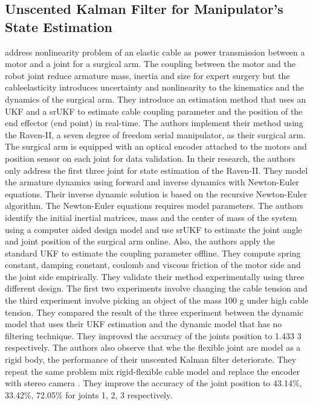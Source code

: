 \subsection{Unscented Kalman Filter for Manipulator's State Estimation}\label{sec:ukf_state_estimation}
\textcite{Haghighipanah2015} address nonlinearity problem of an elastic cable as power
transmission between a motor and a joint for a surgical arm. The coupling between the motor
and the robot joint reduce armature mass, inertia and size for expert surgery but the cableelasticity introduces uncertainty and nonlinearity to the kinematics and the dynamics of the
surgical arm. They introduce an estimation method that uses an \acrfull{UKF} and a \acrfull{srUKF} to estimate cable coupling parameter and the
position of the end effector (end point) in real-time. The authors implement their method using
the Raven-II, a seven degree of freedom serial manipulator, as their surgical arm. The surgical
arm is equipped with an optical encoder attached to the motors and position sensor on each
joint for data validation. In their research, the authors only address the first three joint for state
estimation of the Raven-II. They model the armature dynamics using forward and inverse
dynamics with Newton-Euler equations. Their inverse dynamic solution is based on the
recursive Newton-Euler algorithm. The Newton-Euler equations requires model parameters. The
authors identify the initial inertial matrices, mass and the center of mass of the system using a
computer aided design model and use srUKF to estimate the joint angle and joint position of the
surgical arm online. Also, the authors apply the standard UKF to estimate the coupling
parameter offline. They compute spring constant, damping constant, coulomb and viscous
friction of the motor side and the joint side empirically. They validate their method
experimentally using three different design. The first two experiments involve changing the
cable tension and the third experiment involve picking an object of the mass 100 g under high
cable tension. They compared the result of the three experiment between the dynamic model
that uses their UKF estimation and the dynamic model that has no filtering technique. They
improved the accuracy of the joints position to 1.433%
3 respectively. The authors also observe that whe the flexible joint are model as a rigid body,
the performance of their unscented Kalman filter deteriorate. They repeat the same problem mix
rigid-flexible cable model and replace the encoder with stereo camera \parencite{Haghighipanah2016}. 
They improve the accuracy of the joint position to 43.14\%, 33.42\%, 72.05\% for joints 1,
2, 3 respectively.

